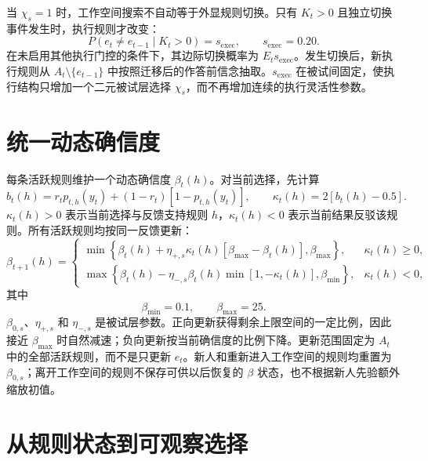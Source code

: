\documentclass[12pt]{article}
\begin{document}
当 $\chi_s=1$ 时，工作空间搜索不自动等于外显规则切换。只有 $K_t>0$ 且独立切换事件发生时，执行规则才改变：
\begin{equation}
P(e_t\neq e_{t-1}\mid K_t>0)=s_{\mathrm{exec}},
\qquad
s_{\mathrm{exec}}=0.20.
\label{eq:execution-switch}
\end{equation}
在未启用其他执行门控的条件下，其边际切换概率为 $E_t s_{\mathrm{exec}}$。发生切换后，新执行规则从 $A_t\setminus\{e_{t-1}\}$ 中按照迁移后的作答前信念抽取。$s_{\mathrm{exec}}$ 在被试间固定，使执行结构只增加一个二元被试层选择 $\chi_s$，而不再增加连续的执行灵活性参数。


\section{统一动态确信度}

每条活跃规则维护一个动态确信度 $\beta_t(h)$。对当前选择，先计算
\begin{equation}
b_t(h)
=r_t p_{t,h}(y_t)
+(1-r_t)[1-p_{t,h}(y_t)],
\qquad
\kappa_t(h)=2[b_t(h)-0.5].
\label{eq:beta-evidence}
\end{equation}
$\kappa_t(h)>0$ 表示当前选择与反馈支持规则 $h$，$\kappa_t(h)<0$ 表示当前结果反驳该规则。所有活跃规则均按同一反馈更新：
\begin{equation}
\beta_{t+1}(h)=
\begin{cases}
\min\!\left\{
\beta_t(h)+\eta_{+,s}\kappa_t(h)
[\beta_{\max}-\beta_t(h)],
\beta_{\max}
\right\},
&\kappa_t(h)\geq0,\\[6pt]
\max\!\left\{
\beta_t(h)-\eta_{-,s}\beta_t(h)
\min[1,-\kappa_t(h)],
\beta_{\min}
\right\},
&\kappa_t(h)<0,
\end{cases}
\label{eq:beta-update}
\end{equation}
其中
\begin{equation}
\beta_{\min}=0.1,
\qquad
\beta_{\max}=25.
\label{eq:beta-bounds}
\end{equation}
$\beta_{0,s}$、$\eta_{+,s}$ 和 $\eta_{-,s}$ 是被试层参数。正向更新获得剩余上限空间的一定比例，因此接近 $\beta_{\max}$ 时自然减速；负向更新按当前确信度的比例下降。更新范围固定为 $A_t$ 中的全部活跃规则，而不是只更新 $e_t$。新人和重新进入工作空间的规则均重置为 $\beta_{0,s}$；离开工作空间的规则不保存可供以后恢复的 $\beta$ 状态，也不根据新人先验额外缩放初值。


\section{从规则状态到可观察选择}
\end{document}
